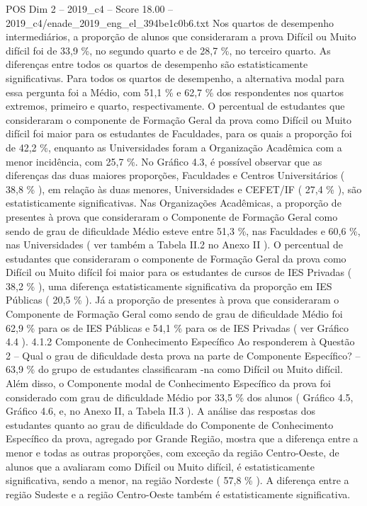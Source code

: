 \begin{textsample}{POS Dim 2 – 2019\_c4 – Score 18.00 – 2019\_c4/enade\_2019\_eng\_el\_394be1c0b6.txt}
Nos quartos de desempenho intermediários, a proporção de alunos que consideraram a prova Difícil ou Muito difícil foi de 33,9 \%, no segundo quarto e de 28,7 \%, no terceiro quarto.
As diferenças entre todos os quartos de desempenho são estatisticamente significativas.
Para todos os quartos de desempenho, a alternativa modal para essa pergunta foi a Médio, com 51,1 \% e 62,7 \% dos respondentes nos quartos extremos, primeiro e quarto, respectivamente.
O percentual de estudantes que consideraram o componente de Formação Geral da prova como Difícil ou Muito difícil foi maior para os estudantes de Faculdades, para os quais a proporção foi de 42,2 \%, enquanto as Universidades foram a Organização Acadêmica com a menor incidência, com 25,7 \%.
No Gráfico 4.3, é possível observar que as diferenças das duas maiores proporções, Faculdades e Centros Universitários ( 38,8 \% ), em relação às duas menores, Universidades e CEFET/IF ( 27,4 \% ), são estatisticamente significativas.
Nas Organizações Acadêmicas, a proporção de presentes à prova que consideraram o Componente de Formação Geral como sendo de grau de dificuldade Médio esteve entre 51,3 \%, nas Faculdades e 60,6 \%, nas Universidades ( ver também a Tabela II.2 no Anexo II ).
O percentual de estudantes que consideraram o componente de Formação Geral da prova como Difícil ou Muito difícil foi maior para os estudantes de cursos de IES Privadas ( 38,2 \% ), uma diferença estatisticamente significativa da proporção em IES Públicas ( 20,5 \% ).
Já a proporção de presentes à prova que consideraram o Componente de Formação Geral como sendo de grau de dificuldade Médio foi 62,9 \% para os de IES Públicas e 54,1 \% para os de IES Privadas ( ver Gráfico 4.4 ). 4.1.2 Componente de Conhecimento Específico Ao responderem à Questão 2 – Qual o grau de dificuldade desta prova na parte de Componente Específico? – 63,9 \% do grupo de estudantes classificaram -na como Difícil ou Muito difícil.
Além disso, o Componente modal de Conhecimento Específico da prova foi considerado com grau de dificuldade Médio por 33,5 \% dos alunos ( Gráfico 4.5, Gráfico 4.6, e, no Anexo II, a Tabela II.3 ).
A análise das respostas dos estudantes quanto ao grau de dificuldade do Componente de Conhecimento Específico da prova, agregado por Grande Região, mostra que a diferença entre a menor e todas as outras proporções, com exceção da região Centro-Oeste, de alunos que a avaliaram como Difícil ou Muito difícil, é estatisticamente significativa, sendo a menor, na região Nordeste ( 57,8 \% ).
A diferença entre a região Sudeste e a região Centro-Oeste também é estatisticamente significativa.

\end{textsample}
